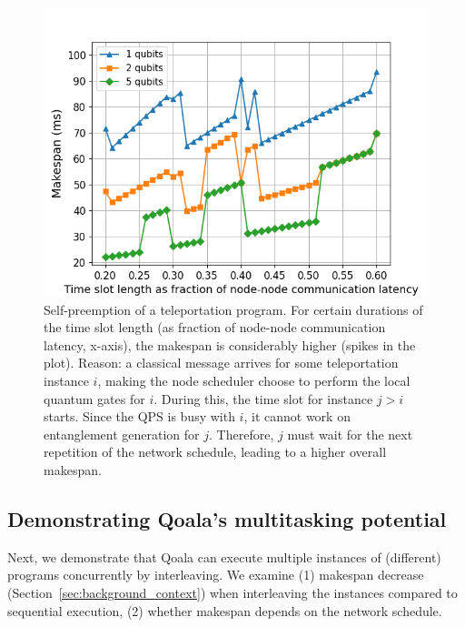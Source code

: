 \begin{figure}%
    \centering
    \includegraphics[width=1.0\columnwidth]{figures/qoala/teleport-self-preemption.png}
    \caption{Self-preemption of a teleportation program.
    For certain durations of the time slot length (as fraction of node-node communication latency, x-axis), the makespan is considerably higher (spikes in the plot).
    Reason: a classical message arrives for some teleportation instance $i$,
    making the node scheduler choose to perform the local quantum gates for $i$. During this,
    the time slot for instance $j > i$ starts. Since the QPS is busy with $i$, it cannot work on entanglement
    generation for $j$. Therefore, $j$ must wait for the next repetition of the network schedule, leading to a higher overall makespan.
    }
    \label{fig:teleport_self_preemption}
\end{figure}

\subsection{Demonstrating Qoala's multitasking potential}
Next, we demonstrate that Qoala can execute multiple instances of (different) programs concurrently by interleaving. We examine (1) makespan decrease (Section~\ref{sec:background_context}) when interleaving the instances compared to sequential execution, %
(2) whether makespan depends on the network schedule.


